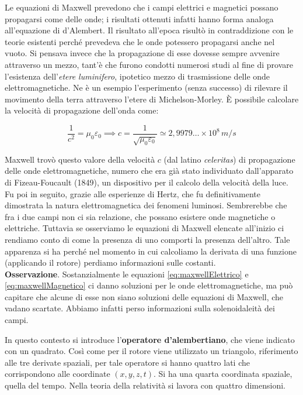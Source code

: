 Le equazioni di Maxwell prevedono che i campi elettrici e magnetici possano propagarsi come delle onde; i risultati ottenuti infatti hanno forma analoga all'equazione di d'Alembert. Il risultato all'epoca risultò in contraddizione con le teorie esistenti perché prevedeva che le onde potessero propagarsi anche nel vuoto. Si pensava invece che la propagazione di esse dovesse sempre avvenire attraverso un mezzo, tant'è che furono condotti numerosi studi al fine di provare l'esistenza dell'\emph{etere luminifero}, ipotetico mezzo di trasmissione delle onde elettromagnetiche. Ne è un esempio l'esperimento (senza successo) di rilevare il movimento della terra attraverso l'etere di Michelson-Morley. È possibile calcolare la velocità di propagazione dell'onda come:

\[
	\frac{1}{c^2} = \mu_0 \varepsilon_0 \implies c = \frac{1}{\sqrt{\mu_0 \varepsilon_0}} \simeq 2,9979\ldots  \times 10^8 \,m/s
\]

Maxwell trovò questo valore della velocità $c$ (dal latino \emph{celeritas}) di propagazione delle onde elettromagnetiche, numero che era già stato individuato dall'apparato di Fizeau-Foucault (1849), un dispositivo per il calcolo della velocità della luce. Fu poi in seguito, grazie alle esperienze di Hertz, che fu definitivamente dimostrata la natura elettromagnetica dei fenomeni luminosi.
Sembrerebbe che fra i due campi non ci sia relazione, che possano esistere onde magnetiche o elettriche. Tuttavia se osserviamo le equazioni di Maxwell elencate all'inizio ci rendiamo conto di come la presenza di uno comporti la presenza dell'altro. Tale apparenza si ha perché nel momento in cui calcoliamo la derivata di una funzione (applicando il rotore) perdiamo informazioni sulle costanti.\\
\textbf{Osservazione}. Sostanzialmente le equazioni \eqref{eq:maxwellElettrico} e \eqref{eq:maxwellMagnetico} ci danno soluzioni per le onde elettromagnetiche, ma può capitare che alcune di esse non siano soluzioni delle equazioni di Maxwell, che vadano scartate. Abbiamo infatti perso informazioni sulla solenoidaleità dei campi.

In questo contesto si introduce l'\textbf{operatore d'alembertiano}, che viene indicato con un quadrato. Così come per il rotore viene utilizzato un triangolo, riferimento alle tre derivate spaziali, per tale operatore si hanno quattro lati che corrispondono alle coordinate $(x,y,z,t)$. Si ha una quarta coordinata spaziale, quella del tempo. Nella teoria della relatività si lavora con quattro dimensioni.


